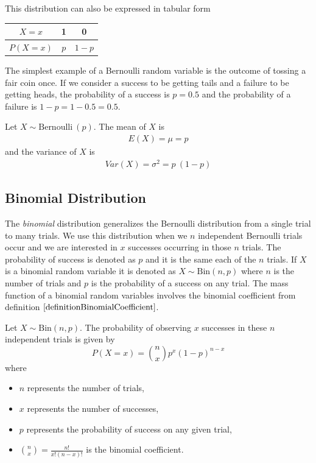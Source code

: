 \noindent
This distribution can also be expressed in tabular form
\begin{center}
\def\arraystretch{1.5}
\begin{tabular}{c | c | c}
$X=x$	&	1	&	0	\\
\hline
$P(X=x)$	&	$p$	&	$1-p$	\\
\end{tabular}
\end{center}

\noindent
The simplest example of a Bernoulli random variable is the outcome of tossing a fair coin once. If we consider a success to be getting tails and a failure to be getting heads, the probability of a success is $p=0.5$ and the probability of a failure
is $1-p = 1-0.5 = 0.5$.

\begin{definition}
Let $X \sim \text{Bernoulli}~(p)$. 
The mean of $X$ is
	\begin{align}
	E(X) = \mu = p	\label{meanBernoulli}
	\end{align}
and the variance of $X$ is
	\begin{align}
	Var(X) = \sigma^{2} = p~(1-p)
	\end{align}
\end{definition}



\subsection{Binomial Distribution}

The \textit{binomial} distribution generalizes the Bernoulli distribution from a single trial to many trials.
We use this distribution when we $n$ independent Bernoulli trials occur and we are 
interested in $x$ successes occurring in those $n$ trials. 
The probability of success is denoted as $p$ and it is the same each of the $n$ trials. 
If $X$ is a binomial random variable it is denoted as $X \sim \text{Bin}(n, p)$ where $n$ is the number of trials and $p$ is the probability of a success on any trial.
The mass function of a binomial random variables involves the binomial coefficient
from definition $\ref{definitionBinomialCoefficient}$.

\begin{pmf}
\label{pmfBinomial}
Let $X \sim \text{Bin}(n, p)$.
The probability of observing $x$ successes in these $n$ independent trials is given by
	\justifying
	\begin{equation}
	P(X = x) = {n \choose x} p^{x} (1 - p)^{n - x}
	\end{equation}
where
\begin{itemize}
\item[] $n$ represents the number of trials,
\item[] $x$ represents the number of successes,
\item[] $p$ represents the probability of success on any given trial,
\item[] $\displaystyle {n \choose x} = \frac{n!}{x!(n-x)!}$ is the binomial coefficient.
\end{itemize}
\end{pmf}

